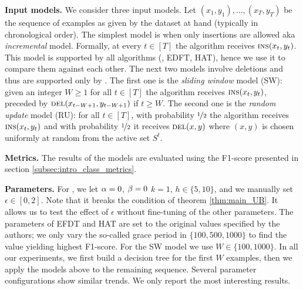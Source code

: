 \noindent\textbf{Input models.} We consider three input models. Let $(x_1,y_1), \dots ,(x_T,y_T)$ be the sequence of examples as given by the dataset at hand (typically in chronological order). The simplest model is when only insertions are allowed aka \emph{incremental} model. %
Formally, at every $t \in [T]$ the algorithm receives $\textsc{ins}(x_t,y_t)$. This model is supported by all algorithms (\algo{}, EDFT, HAT), hence we use it to compare them against each other.
The next two models involve deletions and thus are supported only by \algo{}. The first one is the \emph{sliding window} model (SW): given an integer $W \ge 1$ for all $t \in [T]$ the algorithm receives $\textsc{ins}(x_t,y_t)$, preceded by $\textsc{del}(x_{t-W+1},y_{t-W+1})$ if $t \ge W$. The second one is the \emph{random update} model (RU): for all $t \in [T]$, with probability $\nicefrac12$ the algorithm receives $\textsc{ins}(x_t,y_t)$ and with probability $\nicefrac12$ it receives $\textsc{del}(x,y)$ where $(x,y)$ is chosen uniformly at random from the active set $S^t$. %

\noindent\textbf{Metrics.} The results of the models are evaluated using the F1-score presented in section \ref{subsec:intro_class_metrics}.  

\noindent\textbf{Parameters.} 
For \algo{}, we let $\alpha = 0$, $\beta = 0$ $k = 1$, $h \in \{5,10\}$, and we manually set $\epsilon \in [0,2]$. Note that it breaks the condition of theorem \ref{thm:main_UB}. It allows us to test the effect of $\epsilon$ without fine-tuning of the other parameters.
The parameters of EFDT and HAT are set to the original values specified by the authors; we only vary the so-called grace period in $\{100, 500, 1000\}$ to find the value yielding highest F1-score. For the SW model we use $W\in\{100,1000\}$.  In all our experiments, we first build a decision tree for the first $W$ examples, then we apply the models above to the remaining sequence. Several parameter configurations show similar trends. We only report the most interesting results.%


